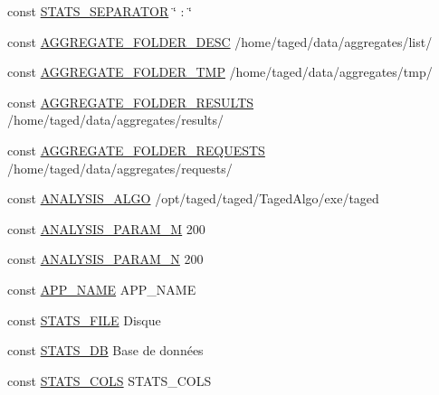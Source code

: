 \begin{DoxyCompactItemize}
const \hyperlink{application_2src_2define_8php_af1399dd717b24f18a7917b1a5e43eb04}{S\+T\+A\+T\+S\+\_\+\+S\+E\+P\+A\+R\+A\+T\+OR} \char`\"{} \+: \char`\"{}
\item 
const \hyperlink{application_2src_2define_8php_a31fbb35aca55ac5b16972f6d309e92e2}{A\+G\+G\+R\+E\+G\+A\+T\+E\+\_\+\+F\+O\+L\+D\+E\+R\+\_\+\+D\+E\+SC} \textquotesingle{}/home/taged/data/aggregates/list/\textquotesingle{}
\item 
const \hyperlink{application_2src_2define_8php_a2835a81110c56552cd1455bd24c83716}{A\+G\+G\+R\+E\+G\+A\+T\+E\+\_\+\+F\+O\+L\+D\+E\+R\+\_\+\+T\+MP} \textquotesingle{}/home/taged/data/aggregates/tmp/\textquotesingle{}
\item 
const \hyperlink{application_2src_2define_8php_acbdffc1e19ba787bad3d1ed15539baf0}{A\+G\+G\+R\+E\+G\+A\+T\+E\+\_\+\+F\+O\+L\+D\+E\+R\+\_\+\+R\+E\+S\+U\+L\+TS} \textquotesingle{}/home/taged/data/aggregates/results/\textquotesingle{}
\item 
const \hyperlink{application_2src_2define_8php_ad43e325ec6363b43f061104efa6a0de3}{A\+G\+G\+R\+E\+G\+A\+T\+E\+\_\+\+F\+O\+L\+D\+E\+R\+\_\+\+R\+E\+Q\+U\+E\+S\+TS} \textquotesingle{}/home/taged/data/aggregates/requests/\textquotesingle{}
\item 
const \hyperlink{application_2src_2define_8php_ad0087d2ba5e375e73b0379adb8941a18}{A\+N\+A\+L\+Y\+S\+I\+S\+\_\+\+A\+L\+GO} \textquotesingle{}/opt/taged/taged/Taged\+Algo/exe/taged\textquotesingle{}
\item 
const \hyperlink{application_2src_2define_8php_a04040f997f4703cddc7b947154721fb3}{A\+N\+A\+L\+Y\+S\+I\+S\+\_\+\+P\+A\+R\+A\+M\+\_\+M} 200
\item 
const \hyperlink{application_2src_2define_8php_ad413b3bbc00b17e9f9034a0b29212c13}{A\+N\+A\+L\+Y\+S\+I\+S\+\_\+\+P\+A\+R\+A\+M\+\_\+N} 200
\item 
const \hyperlink{application_2src_2define_8php_aec1351293f88691205169becf08d525d}{A\+P\+P\+\_\+\+N\+A\+ME} \textquotesingle{}A\+P\+P\+\_\+\+N\+A\+ME\textquotesingle{}
\item 
const \hyperlink{application_2src_2define_8php_a899a8b4f64291fd6fca09c4f4256dc87}{S\+T\+A\+T\+S\+\_\+\+F\+I\+LE} \textquotesingle{}Disque\textquotesingle{}
\item 
const \hyperlink{application_2src_2define_8php_afbaef20bcc8e1291fe3dfe18ee913408}{S\+T\+A\+T\+S\+\_\+\+DB} \textquotesingle{}Base de données\textquotesingle{}
\item 
const \hyperlink{application_2src_2define_8php_a17a08ade6106b31818a9affa691037d0}{S\+T\+A\+T\+S\+\_\+\+C\+O\+LS} \textquotesingle{}S\+T\+A\+T\+S\+\_\+\+C\+O\+LS\textquotesingle{}

\end{DoxyCompactItemize}
